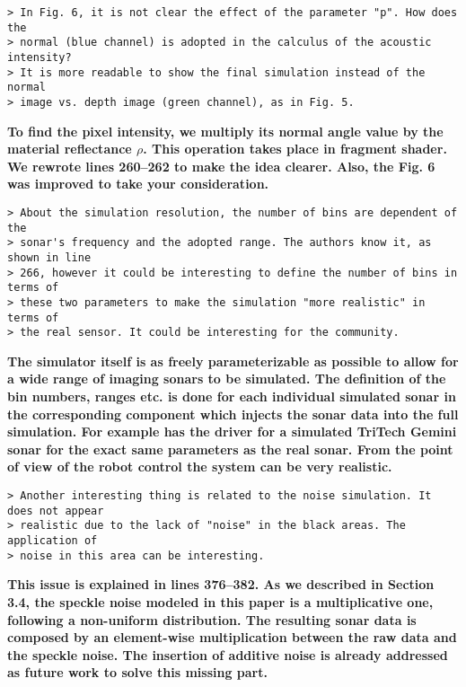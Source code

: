 \documentclass{article}
\begin{document}
\begin{verbatim}
> In Fig. 6, it is not clear the effect of the parameter "p". How does the
> normal (blue channel) is adopted in the calculus of the acoustic intensity?
> It is more readable to show the final simulation instead of the normal
> image vs. depth image (green channel), as in Fig. 5.
\end{verbatim}

\textbf{To find the pixel intensity, we multiply its normal angle value by the
material reflectance $\rho$. This operation takes place in fragment shader.
We rewrote lines 260--262 to make the idea clearer. Also, the Fig. 6 was
improved to take your consideration.}

\begin{verbatim}
> About the simulation resolution, the number of bins are dependent of the
> sonar's frequency and the adopted range. The authors know it, as shown in line
> 266, however it could be interesting to define the number of bins in terms of
> these two parameters to make the simulation "more realistic" in terms of
> the real sensor. It could be interesting for the community.
\end{verbatim}

\textbf{The simulator itself is as freely parameterizable as possible to allow for a wide range of imaging 
sonars to be simulated. The definition of the bin numbers, ranges etc. is done for each individual 
simulated sonar in the corresponding component which injects the sonar data into the full simulation. 
For example has the driver for a simulated TriTech Gemini sonar for the exact same parameters as the 
real sonar. From the point of view of the robot control the system can be very realistic.}

\begin{verbatim}
> Another interesting thing is related to the noise simulation. It does not appear
> realistic due to the lack of "noise" in the black areas. The application of
> noise in this area can be interesting.
\end{verbatim}

\textbf{This issue is explained in lines 376--382. As we described in
Section 3.4, the speckle noise modeled in this paper is a multiplicative one,
following a non-uniform distribution. The resulting sonar data is composed by
an element-wise multiplication between the raw data and the speckle noise. The
insertion of additive noise is already addressed as future work to solve this
missing part.}
\end{document}
